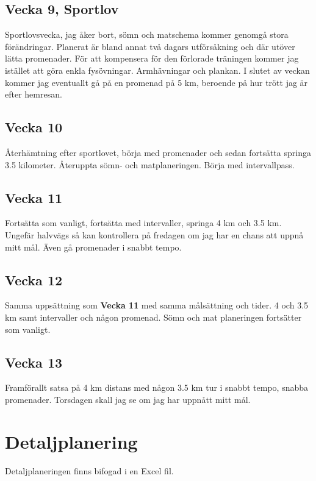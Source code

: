 \documentclass{article}
\begin{document}
\subsection{Vecka 9, Sportlov}

	Sportlovsvecka, jag åker bort, sömn och matschema kommer genomgå stora förändringar. Planerat är bland annat två dagars utförsåkning och där utöver lätta promenader. För att kompensera för den förlorade träningen kommer jag istället att göra enkla fysövningar. Armhävningar och plankan. I slutet av veckan kommer jag eventuallt gå på en promenad på 5 km, beroende på hur trött jag är efter hemresan. 
		
	
\subsection{Vecka 10}

	Återhämtning efter sportlovet, börja med promenader och sedan fortsätta springa 3.5 kilometer. Återuppta sömn- och matplaneringen. Börja med intervallpass. 

\subsection{Vecka 11}

	Fortsätta som vanligt, fortsätta med intervaller, springa 4 km och 3.5 km. Ungefär halvvägs så kan kontrollera på fredagen om jag har en chans att uppnå mitt mål. Även gå promenader i snabbt tempo.

\subsection{Vecka 12}

Samma uppsättning som \textbf{{Vecka 11}} med samma målsättning och tider. 4 och 3.5 km samt intervaller och någon promenad. Sömn och mat planeringen fortsätter som vanligt. 

\subsection{Vecka 13}

	Framförallt satsa på 4 km distans med någon 3.5 km tur i snabbt tempo, snabba promenader. Torsdagen skall jag se om jag har uppnått mitt mål. 


\section{Detaljplanering}
	Detaljplaneringen finns bifogad i en Excel fil.
	
\end{document}
